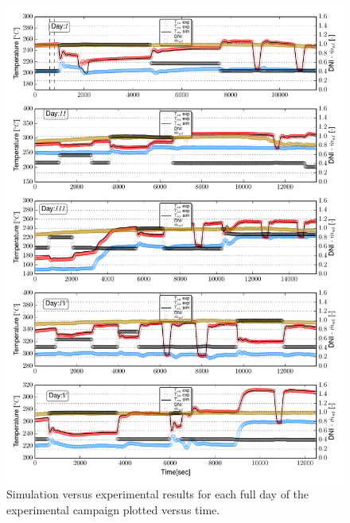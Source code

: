 \documentclass[final,3p,times,review]{elsarticle}
\begin{document}
\begin{figure}[h!]
\centering
\includegraphics[width=1\textwidth]{Figures/_FirstFiveDays.pdf}
\caption{Simulation versus experimental results for each full day of the experimental campaign plotted versus time. }
\label{fig:SF_ModRes_All}
\end{figure}
%
\end{document}
